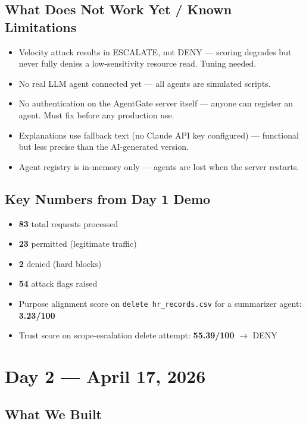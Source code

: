 \documentclass[12pt, a4paper]{article}
\begin{document}
\subsection{What Does Not Work Yet / Known Limitations}

\begin{itemize}[noitemsep]
  \item Velocity attack results in ESCALATE, not DENY — scoring degrades but never fully denies a low-sensitivity resource read. Tuning needed.
  \item No real LLM agent connected yet — all agents are simulated scripts.
  \item No authentication on the AgentGate server itself — anyone can register an agent. Must fix before any production use.
  \item Explanations use fallback text (no Claude API key configured) — functional but less precise than the AI-generated version.
  \item Agent registry is in-memory only — agents are lost when the server restarts.
\end{itemize}

\subsection{Key Numbers from Day 1 Demo}

\begin{itemize}[noitemsep]
  \item \textbf{83} total requests processed
  \item \textbf{23} permitted (legitimate traffic)
  \item \textbf{2} denied (hard blocks)
  \item \textbf{54} attack flags raised
  \item Purpose alignment score on \texttt{delete hr\_records.csv} for a summarizer agent: \textbf{3.23/100}
  \item Trust score on scope-escalation delete attempt: \textbf{55.39/100} $\rightarrow$ DENY
\end{itemize}

\section{Day 2 — April 17, 2026}

\subsection{What We Built}
\end{document}
